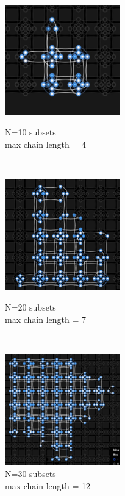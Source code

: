 \documentclass[oneside,a4paper]{article}
\begin{document}
\begin{figure}[htp]
\centering
\begin{minipage}[b]{4.5cm}

\includegraphics[width=5cm]{LaTeXTemplate/Images/2000Qfirst10.png}
\caption{N=10 subsets\\max chain length = 4}
\end{minipage}
\ \hspace{2mm} \hspace{2mm} \
\begin{minipage}[b]{4.5cm}

\includegraphics[width=5cm]{LaTeXTemplate/Images/2000Qfirst20.png}
\caption{N=20 subsets\\max chain length = 7}
\end{minipage}
\ \hspace{2mm} \hspace{2mm} \
\begin{minipage}[b]{4.5cm}
\centering
\includegraphics[width=5cm]{LaTeXTemplate/Images/2000Qfirst30.png}
\caption{N=30 subsets\\max chain length = 12}
\end{minipage}
\end{figure}
\end{document}
